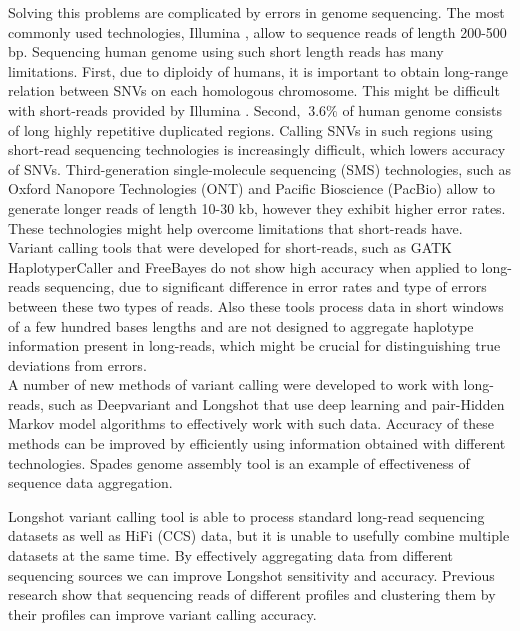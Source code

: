 \documentclass[a4paper, 12pt]{article}
\theoremstyle{definition}
\theoremstyle{definition}
\theoremstyle{remark}
\begin{document}
Solving this problems are complicated by errors in genome sequencing. 
The most commonly used technologies, Illumina \cite{goodwin2016coming}, 
allow to sequence reads of length 200-500 bp.
Sequencing human genome using such short length reads 
has many limitations. 
First, due to diploidy of humans, it is important to obtain
long-range relation between SNVs on each homologous chromosome. This might be difficult 
with short-reads provided by Illumina \cite{goodwin2016coming}. 
Second, $~3.6\%$ \cite{edge_longshot_2019} of 
human genome consists of long highly repetitive 
duplicated regions. Calling SNVs in such regions using short-read sequencing technologies 
is increasingly difficult, which lowers accuracy of SNVs. 
Third-generation single-molecule sequencing (SMS) technologies,
such as Oxford Nanopore Technologies (ONT) \cite{jain2016oxford} and 
Pacific Bioscience (PacBio) \cite{rhoads2015pacbio} allow to   
generate longer reads of length 10-30 kb, however they exhibit higher error rates.
These technologies might help overcome limitations that short-reads have. 
Variant calling tools that were developed 
for short-reads, such as GATK HaplotyperCaller \cite{mckenna2010genome} and 
FreeBayes \cite{garrison2012haplotype} do not show high accuracy when applied 
to long-reads sequencing, due to significant difference 
in error rates and type of errors between these two types of reads. 
Also these tools process data in short windows 
of a few hundred bases lengths and are not designed to aggregate  
haplotype information present in long-reads, 
which might be crucial for distinguishing true deviations 
from errors.  \\
A number of new methods of variant calling were developed 
to work with long-reads, such as Deepvariant \cite{poplin2018universal}
and Longshot \cite{edge_longshot_2019} that use deep learning 
and pair-Hidden Markov model algorithms to effectively work with such data. 
Accuracy of these methods can be improved by efficiently using information 
obtained with different technologies.  
Spades \cite{bankevich2012spades} genome assembly tool is an example of effectiveness 
of sequence data aggregation.

Longshot variant calling tool is able to process standard long-read sequencing datasets 
as well as HiFi (CCS) \cite{wenger2019accurate} data, but it is unable to usefully combine 
multiple datasets at the same time. 
By effectively aggregating data from different sequencing sources 
we can improve Longshot \cite{edge_longshot_2019} sensitivity and accuracy.
Previous research show that sequencing reads of 
different profiles and clustering them 
by their profiles can improve variant calling accuracy.
\end{document}
